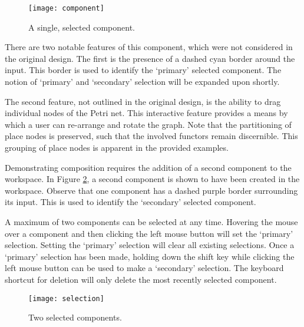 \documentclass[../Dissertation.tex]{subfiles}
\begin{document}
\begin{figure}[H]
\begin{center}
\texttt{[image: component]}
\end{center}
\caption{A single, selected component.}
\label{fig:component}
\end{figure}

There are two notable features of this component, which were not considered in the original design. The first is the presence of a dashed cyan border around the input. This border is used to identify the `primary' selected component. The notion of `primary' and `secondary' selection will be expanded upon shortly.
\par 
The second feature, not outlined in the original design, is the ability to drag individual nodes of the Petri net. This interactive feature provides a means by which a user can re-arrange and rotate the graph. Note that the partitioning of place nodes is preserved, such that the involved functors remain discernible. This grouping of place nodes is apparent in the provided examples.
\par
Demonstrating composition requires the addition of a second component to the workspace. In Figure \ref{fig:selection}, a second component is shown to have been created in the workspace. Observe that one component has a dashed purple border surrounding its input. This is used to identify the `secondary' selected component. 
\par
A maximum of two components can be selected at any time. Hovering the mouse over a component and then clicking the left mouse button will set the `primary' selection. Setting the `primary' selection will clear all existing selections. Once a `primary' selection has been made, holding down the shift key while clicking the left mouse button can be used to make a `secondary' selection. The keyboard shortcut for deletion will only delete the most recently selected component.

\begin{figure}[H]
\begin{center}
\texttt{[image: selection]}
\end{center}
\caption{Two selected components.}
\label{fig:selection}
\end{figure}
\end{document}
